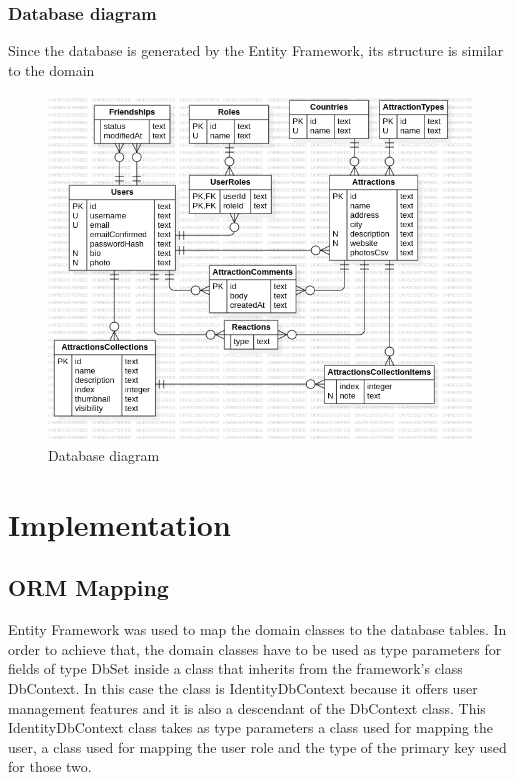 \subsubsection{Database diagram}

\par Since the database is generated by the Entity Framework, its structure is similar to the domain

\begin{figure}[!ht]
    \centering
    \includegraphics[width=1\linewidth]{db-diagram.png}
    \caption{Database diagram}
    \label{fig:enter-label}
\end{figure}

\clearpage %

\section{Implementation}

\subsection{ORM Mapping}

\par Entity Framework was used to map the domain classes to the database tables. In order to achieve that, the domain classes have to be used as type parameters for fields of type DbSet inside a class that inherits from the framework's class DbContext. In this case the class is IdentityDbContext because it offers user management features and it is also a descendant of the DbContext class. This IdentityDbContext class takes as type parameters a class used for mapping the user, a class used for mapping the user role and the type of the primary key used for those two.

